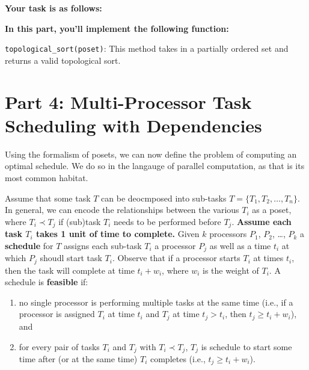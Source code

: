 \documentclass{article}
\begin{document}
\textbf{Your task is as follows:}

    \vspace{3mm}
    \textbf{In this part, you'll implement the following function:}
    \begin{tcolorbox}[colback=blue!10]
        \lstinline{topological_sort(poset)}: This method takes in a partially ordered set and returns a valid topological sort.
    \end{tcolorbox}

\section*{Part 4: Multi-Processor Task Scheduling with Dependencies}


    Using the formalism of posets, we can now define the problem of computing an optimal schedule. We do so in the langauge of parallel computation, as that is its most common habitat. 
    
    
    \vspace{3mm} Assume that some task $T$ can be deocmposed into sub-tasks $T = \{T_{1}, T_{2}, \dots, T_{n}\}$. In general, we can encode the relationships between the various $T_{i}$ as a poset, where $T_{i} \prec T_{j}$ if (sub)task $T_{i}$ needs to be performed before $T_{j}$. \textbf{Assume each task $T_{i}$ takes 1 unit of time to complete.} Given $k$ processors $P_{1}$, $P_{2}$, \dots, $P_{k}$ a \textbf{schedule} for $T$ assigns each sub-task $T_{i}$ a processor $P_{j}$ as well as a time $t_{i}$ at which $P_{j}$ shoudl start task $T_{i}$. Observe that if a processor starts $T_{i}$ at times $t_{i}$, then the task will complete at time $t_{i} + w_{i}$, where $w_{i}$ is the weight of $T_{i}$. A schedule is \textbf{feasible} if:

    \begin{enumerate}[label = \arabic*]
        \item no single processor is performing multiple tasks at the same time (i.e., if a processor is assigned $T_{i}$ at time $t_{i}$ and $T_{j}$ at time $t_{j} > t_{i}$, then $t_{j} \ge t_{i} + w_{i}$), and
        \item for every pair of tasks $T_{i}$ and $T_{j}$ with $T_{i} \prec T_{j}$, $T_{j}$ is schedule to start some time after (or at the same time) $T_{i}$ completes (i.e., $t_{j} \ge t_{i} + w_{i}$).
    \end{enumerate}
\end{document}
